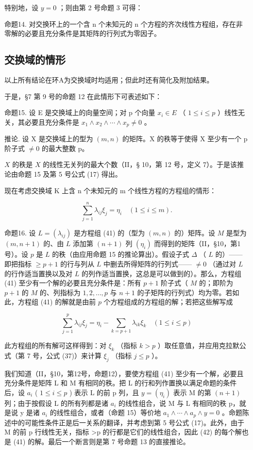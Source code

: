 特别地，设 \(y = 0\) ；则由第 2 号命题 3 可得：

命题14. 对交换环上的一个含 n 个未知元的 n 个方程的齐次线性方程组，存在非零解的必要且充分条件是其矩阵的行列式为零因子。

\subsection{交换域的情形}

以上所有结论在环A为交换域时均适用；但此时还有简化及附加结果。

于是，§7 第 9 号的命题 12 在此情形下可表述如下：

命题15. 设 E 是交换域上的向量空间；对 p 个向量 \(x_{i} \in E\) （ \(1 \leqslant i \leqslant p\) ）线性无关，其必要且充分条件是 \(x_{1} \wedge x_{2} \wedge \cdots \wedge x_{p} \neq 0\) 。

推论. 设 X 是交换域上的型为 \((m, n)\) 的矩阵。X 的秩等于使得 X 至少有一个 p 阶子式 \(\neq0\) 的最大整数 p。

\(X\) 的秩是 \(X\) 的线性无关列的最大个数（II，§ 10，第 12 号，定义 7）。于是该推论由命题 15 及第 5 号公式 (17) 得出。

现在考虑交换域 K 上含 n 个未知元的 m 个线性方程的方程组的情形：

\[
\sum_ {j = 1} ^ {n} \lambda_ {i j} \xi_ {j} = \eta_ {i} \quad (1 \leqslant i \leqslant m).\tag{41}
\]

命题16. 设 \(L = (\lambda_{ij})\) 是方程组 (41) 的（型为 \((m, n)\) 的）矩阵。设 \(M\) 是型为 \((m, n + 1)\) 的、由 \(L\) 添加第 \((n + 1)\) 列 \((\eta_i)\) 而得到的矩阵（II，§10，第1号）。设 \(p\) 是 \(L\) 的秩（由应用命题 15 的推论算出）。假设子式 \(\Delta\) （ \(L\) 的）——即把指标 \(\geqslant p + 1\) 的行与列从 \(L\) 中删去所得矩阵的行列式—— \(\neq 0\) （通过对 \(L\) 的行作适当置换以及对 \(L\) 的列作适当置换，这总是可以做到的）。那么，方程组 (41) 至少有一个解的必要且充分条件是：所有 \(p + 1\) 阶子式（ \(M\) 的；即阶为 \(p + 1\) 的 \(M\) 的、列指标为 \(1, 2, \ldots, p\) 与 \(n + 1\) 的子矩阵的行列式）均为零。若如此，方程组 (41) 的解就是由前 \(p\) 个方程组成的方程组的解；若把这些解写成

\[
\sum_ {j = 1} ^ {p} \lambda_ {i j} \xi_ {j} = \eta_ {i} - \sum_ {k = p + 1} \lambda_ {i k} \xi_ {k} \quad (1 \leqslant i \leqslant p)\tag{42}
\]

此方程组的所有解可这样得到：对 \(\xi_{k}\) （指标 \(k > p\) ）取任意值，并应用克拉默公式（第 7 号，公式 (37)）来计算 \(\xi_{j}\) （指标 \(j \leqslant p\) ）。

我们知道（II，§10，第12号，命题12），要使方程组 (41) 至少有一个解，必要且充分条件是矩阵 L 和 M 有相同的秩。把 L 的行和列作置换以满足命题的条件后，设 \(a_{i}\) ( \(1 \leqslant i \leqslant p\) ) 表示 L 的前 p 列，且 \(y = (\eta_{i})\) 表示 M 的第 \((n + 1)\) 列；由于按假设 L 的所有列都是诸 \(a_{i}\) 的线性组合，说 M 与 L 有相同的秩 p，就是说 y 是诸 \(a_{i}\) 的线性组合，或者（命题 15）等价地 \(a_{1} \wedge \cdots \wedge a_{p} \wedge y = 0\) 。命题陈述中的可能性条件正是后一关系的翻译，并考虑到第 5 号公式 (17)。此外，由于 M 的前 p 行线性无关，指标 \textgreater p 的行都是它们的线性组合，因此 (42) 的每个解也是 (41) 的解。最后一个断言则是第 7 号命题 13 的直接推论。


